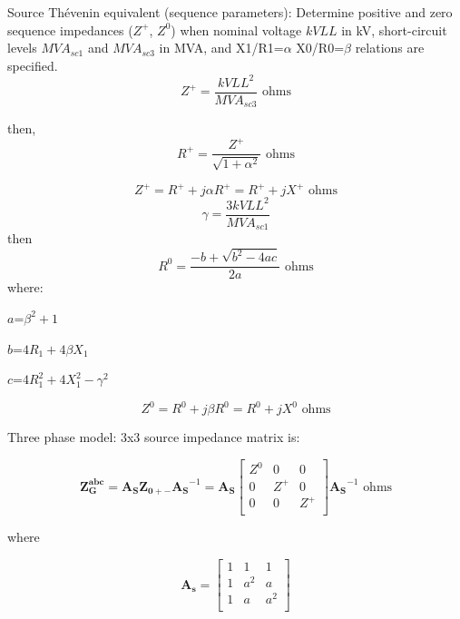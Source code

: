 \documentclass[12pt]{article}
\begin{document}
Source Th\'evenin equivalent (sequence parameters): 
Determine positive and zero sequence impedances (${Z}^{+}$, ${Z}^{0}$) when nominal voltage $kVLL$ in kV, short-circuit levels $MVA_{sc1}$ and $MVA_{sc3}$ in MVA, and X1/R1=$\alpha$ X0/R0=$\beta$ relations are specified.
\begin{equation}
Z^{+}=\frac{kVLL^2}{MVA_{sc3}}\mbox{ ohms}
\end{equation}

then,
\begin{equation}
R^{+}=\frac{Z^{+}}{\sqrt{1+\alpha^2}}\mbox{ ohms}
\end{equation}

\begin{equation}
{Z}^{+}={R^{+}}+j{\alpha R^{+}}={R^{+}}+j{X^{+}}\mbox{ ohms}
\end{equation}
\begin{equation}
\gamma=\frac{3 kVLL^2}{MVA_{sc1}}
\end{equation}
then
\begin{equation}
R^{0}=\frac{-b+\sqrt{b^2-4ac}}{2a}\mbox{ ohms}
\end{equation}
where:

$a$=$\beta^2+1$

$b$=$4R_1+4 \beta X_1$

$c$=$4R_1^2+4X_1^2-\gamma^2$

\begin{equation}
{Z}^{0}={R^{0}}+j{\beta R^{0}}={R^{0}}+j{X^{0}}\mbox{ ohms}
\end{equation}

Three phase model: 3x3 source impedance matrix is:

\begin{equation}
\mathbf{Z^{abc}_{G}}=\mathbf{A_S}
\mathbf{Z_{0+-}}
    \mathbf{A_S}^{-1}=\mathbf{A_S}
\left[ \begin{array}{ccc}
               {Z}^{0} & 0 &0\\
               0 & {Z}^{+} & 0  \\
               0 & 0 & {Z}^{+}  \\
             \end{array}
           \right] \mathbf{A_S}^{-1} 
           \mbox{ ohms}
\end{equation}

where

\begin{equation}
\mathbf{A_s}= 
\left[ \begin{array}{ccc}
               1 & 1 &1\\
               1 & a^2 & a  \\
               1 & a & a^2   \\
             \end{array}
           \right]  
           \end{equation}
\end{document}
